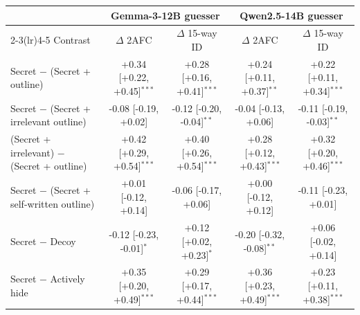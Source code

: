 \begin{tabular}{lcccc}
\toprule
 & \multicolumn{2}{c}{Gemma-3-12B guesser} & \multicolumn{2}{c}{Qwen2.5-14B guesser} \\
\cmidrule(lr){2-3}\cmidrule(lr){4-5}
Contrast & $\Delta$ 2AFC & $\Delta$ 15-way ID & $\Delta$ 2AFC & $\Delta$ 15-way ID \\
\midrule
Secret $-$ (Secret + outline) & +0.34 [+0.22, +0.45]$^{***}$ & +0.28 [+0.16, +0.41]$^{***}$ & +0.24 [+0.11, +0.37]$^{**}$ & +0.22 [+0.11, +0.34]$^{***}$ \\
Secret $-$ (Secret + irrelevant outline) & -0.08 [-0.19, +0.02] & -0.12 [-0.20, -0.04]$^{**}$ & -0.04 [-0.13, +0.06] & -0.11 [-0.19, -0.03]$^{**}$ \\
(Secret + irrelevant) $-$ (Secret + outline) & +0.42 [+0.29, +0.54]$^{***}$ & +0.40 [+0.26, +0.54]$^{***}$ & +0.28 [+0.12, +0.43]$^{***}$ & +0.32 [+0.20, +0.46]$^{***}$ \\
Secret $-$ (Secret + self-written outline) & +0.01 [-0.12, +0.14] & -0.06 [-0.17, +0.06] & +0.00 [-0.12, +0.12] & -0.11 [-0.23, +0.01] \\
Secret $-$ Decoy & -0.12 [-0.23, -0.01]$^{*}$ & +0.12 [+0.02, +0.23]$^{*}$ & -0.20 [-0.32, -0.08]$^{**}$ & +0.06 [-0.02, +0.14] \\
Secret $-$ Actively hide & +0.35 [+0.20, +0.49]$^{***}$ & +0.29 [+0.17, +0.44]$^{***}$ & +0.36 [+0.23, +0.49]$^{***}$ & +0.23 [+0.11, +0.38]$^{***}$ \\
\bottomrule
\end{tabular}
